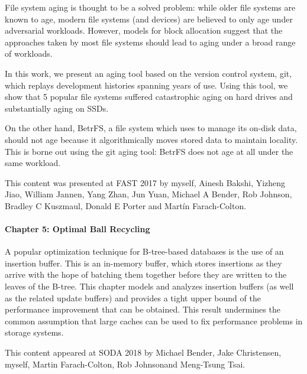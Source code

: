 File system aging is thought to be a solved problem: while older file systems
are known to age, modern file systems (and devices) are believed to only age
under adversarial workloads. However, models for block allocation suggest that
the approaches taken by most file systems should lead to aging under a broad
range of workloads.

In this work, we present an aging tool based on the version control system,
git, which replays development histories spanning years of use.  Using this
tool, we show that 5 popular file systems suffered catastrophic aging on hard
drives and substantially aging on SSDs.

On the other hand, BetrFS, a file system which uses \bets to manage its on-disk
data, should not age because it algorithmically moves stored data to maintain
locality. This is borne out using the git aging tool: BetrFS does not age at
all under the same workload.

This content was presented at FAST 2017 by myself, Ainesh Bakshi, Yizheng Jiao,
William Jannen, Yang Zhan, Jun Yuan, Michael A Bender, Rob Johnson, Bradley C
Kuszmaul, Donald E Porter and Mart\'in Farach-Colton.

\paragraph{Chapter 5: Optimal Ball Recycling}

A popular optimization technique for B-tree-based databases is the use of an
insertion buffer. This is an in-memory buffer, which stores insertions as they
arrive with the hope of batching them together before they are written to the
leaves of the B-tree. This chapter models and analyzes insertion buffers (as
well as the related update buffers) and provides a tight upper bound of the
performance improvement that can be obtained. This result undermines the common
assumption that large caches can be used to fix performance problems in storage
systems.

This content appeared at SODA 2018 by Michael Bender, Jake Christensen, myself,
Martin Farach-Colton, Rob Johnsonand Meng-Tsung Tsai.
